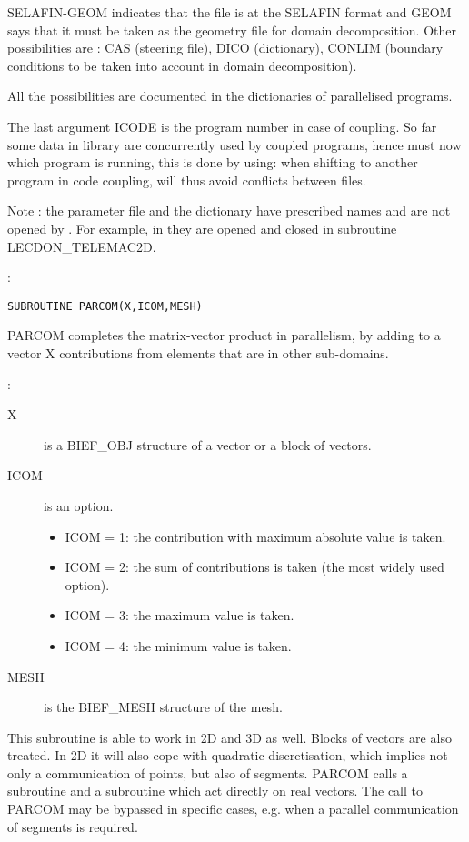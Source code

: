 SELAFIN-GEOM indicates that the file is at the SELAFIN format and GEOM says
that it must be taken as the geometry file for domain decomposition. Other
possibilities are : CAS (steering file), DICO (dictionary), CONLIM (boundary
conditions to be taken into account in domain decomposition).

All the possibilities are documented in the dictionaries of parallelised
programs.

The last argument ICODE is the program number in case of coupling. So far some
data in \bief library are concurrently used by coupled programs, hence \bief
must now which program is running, this is done by using:  when shifting to another program in code coupling,
 will thus avoid conflicts between files.

Note : the parameter file and the dictionary have prescribed names and are not
opened by . For example, in  they are
opened and closed in subroutine LECDON\_TELEMAC2D.

:
\begin{lstlisting}[language=TelFortran]
SUBROUTINE PARCOM(X,ICOM,MESH)
\end{lstlisting}

PARCOM completes the matrix-vector product in parallelism, by adding to a
vector X contributions from elements that are in other sub-domains.

:
\begin{description}
  \item [X] is a BIEF\_OBJ structure of a vector or a block of vectors.
  \item [ICOM] is an option.
    \begin{itemize}
      \item ICOM = 1:  the contribution with maximum absolute value is taken.
      \item ICOM = 2:  the sum of contributions is taken (the most widely used option).
      \item ICOM = 3: the maximum value is taken.
      \item ICOM = 4: the minimum value is taken.
    \end{itemize}
  \item [MESH] is the BIEF\_MESH structure of the mesh.
\end{description}

This subroutine is able to work in 2D and 3D as well. Blocks of vectors are
also treated. In 2D it will also cope with quadratic discretisation, which
implies not only a communication of points, but also of segments. PARCOM calls
a subroutine  and a subroutine  which act
directly on real vectors. The call to PARCOM may be bypassed in specific cases,
e.g. when a parallel communication of segments is required.

